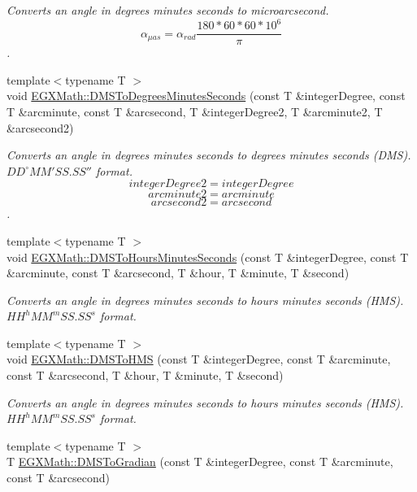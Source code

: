 \begin{DoxyCompactItemize}
\begin{DoxyCompactList}\small\item\em Converts an angle in degrees minutes seconds to microarcsecond. \[\alpha_{\mu as}=\alpha_{rad}\frac{180 * 60 * 60 * 10^6}{\pi}\]. \end{DoxyCompactList}\item 
{\footnotesize template$<$typename T $>$ }\\void \mbox{\hyperlink{group___e_g_x_math-_angle_conversions-_d_m_s_gae8804d622399df85d60c0c8bb5c6ebc5}{E\+G\+X\+Math\+::\+D\+M\+S\+To\+Degrees\+Minutes\+Seconds}} (const T \&integer\+Degree, const T \&arcminute, const T \&arcsecond, T \&integer\+Degree2, T \&arcminute2, T \&arcsecond2)
\begin{DoxyCompactList}\small\item\em Converts an angle in degrees minutes seconds to degrees minutes seconds (D\+MS). ${DD}^{\circ}{MM}'{SS.SS}''$ format. \[integerDegree2 = integerDegree \] \[arcminute2 = arcminute\] \[arcsecond2 = arcsecond\]. \end{DoxyCompactList}\item 
{\footnotesize template$<$typename T $>$ }\\void \mbox{\hyperlink{group___e_g_x_math-_angle_conversions-_d_m_s_ga62f95d8bf79b8788ef6d1003f8d6a65f}{E\+G\+X\+Math\+::\+D\+M\+S\+To\+Hours\+Minutes\+Seconds}} (const T \&integer\+Degree, const T \&arcminute, const T \&arcsecond, T \&hour, T \&minute, T \&second)
\begin{DoxyCompactList}\small\item\em Converts an angle in degrees minutes seconds to hours minutes seconds (H\+MS). ${HH}^h{MM}^m{SS.SS}^s$ format. \end{DoxyCompactList}\item 
{\footnotesize template$<$typename T $>$ }\\void \mbox{\hyperlink{group___e_g_x_math-_angle_conversions-_d_m_s_ga570e90c6555753cccfcaa55f0e6374ac}{E\+G\+X\+Math\+::\+D\+M\+S\+To\+H\+MS}} (const T \&integer\+Degree, const T \&arcminute, const T \&arcsecond, T \&hour, T \&minute, T \&second)
\begin{DoxyCompactList}\small\item\em Converts an angle in degrees minutes seconds to hours minutes seconds (H\+MS). ${HH}^h{MM}^m{SS.SS}^s$ format. \end{DoxyCompactList}\item 
{\footnotesize template$<$typename T $>$ }\\T \mbox{\hyperlink{group___e_g_x_math-_angle_conversions-_d_m_s_ga2abca0654499b46df6ab9592f95b9ef1}{E\+G\+X\+Math\+::\+D\+M\+S\+To\+Gradian}} (const T \&integer\+Degree, const T \&arcminute, const T \&arcsecond)

\end{DoxyCompactItemize}
